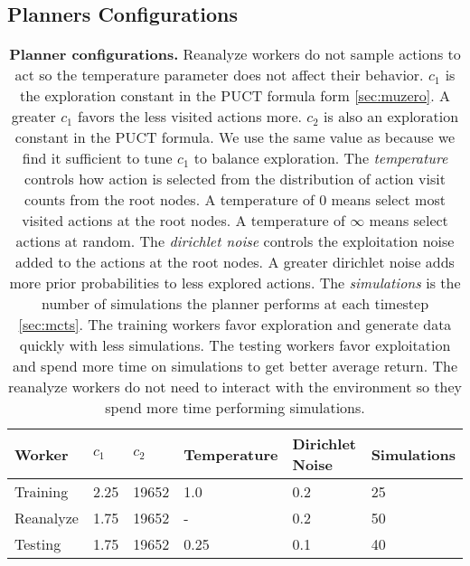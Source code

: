 \subsection{Planners Configurations} \label{sec:planner_config}
\begin{table}
    \begin{tabular}{@{}|l|l|l|l|l|l|@{}}
        \toprule
        Worker    & $c_1$ & $c_2$ & Temperature & Dirichlet Noise & Simulations \\ \midrule
        Training  & 2.25  & 19652 & 1.0         & 0.2             & 25          \\ \midrule
        Reanalyze & 1.75  & 19652 & -           & 0.2             & 50          \\ \midrule
        Testing   & 1.75  & 19652 & 0.25        & 0.1             & 40          \\ \bottomrule
    \end{tabular}
    \captionsetup{width=\linewidth}
    \caption{
        \textbf{Planner configurations.}
        Reanalyze workers do not sample actions to act so the temperature parameter does not affect their behavior.
        $c_1$ is the exploration constant in the PUCT formula form \ref{sec:muzero}.
        A greater $c_1$ favors the less visited actions more.
        $c_2$ is also an exploration constant in the PUCT formula.
        We use the same value as \cite{MasteringAtariGo_Schrittwieser.Antonoglou.ea_2020} because we find it sufficient to tune $c_1$ to balance exploration.
        The \textit{temperature} controls how action is selected from the distribution of action visit counts from the root nodes.
        A temperature of 0 means select most visited actions at the root nodes.
        A temperature of $\infty$ means select actions at random.
        The \textit{dirichlet noise} controls the exploitation noise added to the actions at the root nodes.
        A greater dirichlet noise adds more prior probabilities to less explored actions.
        The \textit{simulations} is the number of simulations the planner performs at each timestep \ref{sec:mcts}.
        The training workers favor exploration and generate data quickly with less simulations.
        The testing workers favor exploitation and spend more time on simulations to get better average return.
        The reanalyze workers do not need to interact with the environment so they spend more time performing simulations.
    }
    \label{tb:planner_args}
\end{table}

